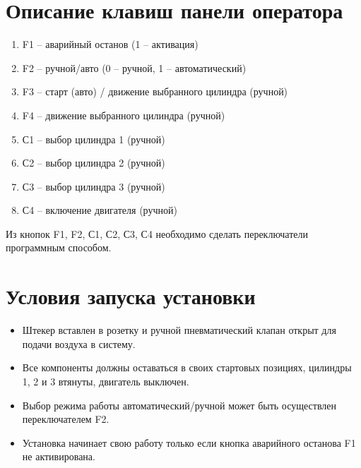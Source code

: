 \section{Описание клавиш панели оператора}
\begin{enumerate}
    \item F1 -- аварийный останов (1 – активация)
    \item F2 -- ручной/авто (0 – ручной, 1 – автоматический)
    \item F3 -- старт (авто) / движение выбранного цилиндра (ручной)
    \item F4 -- движение выбранного цилиндра (ручной)
    \item С1 -- выбор цилиндра 1 (ручной)
    \item С2 -- выбор цилиндра 2 (ручной)
    \item С3 -- выбор цилиндра 3 (ручной)
    \item С4 -- включение двигателя (ручной)
\end{enumerate}

Из кнопок F1, F2, С1, С2, С3, С4 необходимо сделать переключатели
программным способом.

\section{Условия запуска установки}
\begin{itemize}
    \item Штекер вставлен в розетку и ручной пневматический клапан открыт для подачи воздуха в систему.
    \item Все компоненты должны оставаться в своих стартовых позициях, цилиндры 1, 2 и 3 втянуты, двигатель выключен.
    \item Выбор режима работы автоматический/ручной может быть осуществлен переключателем F2.
    \item Установка начинает свою работу только если кнопка аварийного останова F1 не активирована.
\end{itemize}

